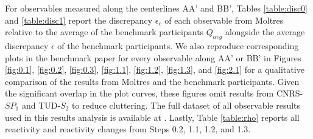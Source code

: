 For observables measured along the centerlines AA' and BB', Tables
\ref{table:disc0} and \ref{table:disc1} report the discrepancy $\epsilon_c$ of
each observable from Moltres relative to the average of the benchmark
participants $Q_{avg}$ alongside the average discrepancy $\epsilon$ of
the benchmark participants. We also reproduce corresponding plots
in the benchmark paper for every observable along AA' or BB' in Figures
\ref{fig:0.1}, \ref{fig:0.2}, \ref{fig:0.3}, \ref{fig:1.1}, \ref{fig:1.2},
\ref{fig:1.3}, and \ref{fig:2.1} for a qualitative comparison of the results
from Moltres and the benchmark participants. Given the significant overlap in
the plot curves, these figures omit results from CNRS-$SP_1$ and TUD-$S_2$ to
reduce cluttering. The full dataset
of all observable results used in this results analysis is
available at \cite{park_results_2021}. Lastly, Table
\ref{table:rho} reports all reactivity and reactivity changes from
Steps 0.2, 1.1, 1.2, and 1.3.

